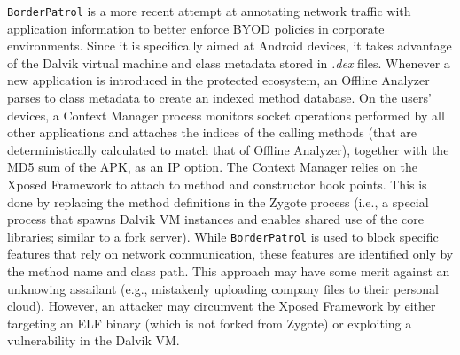 \texttt{BorderPatrol} \cite{zungur2019borderpatrol} is a more recent attempt at annotating network traffic with application information to better enforce BYOD policies in corporate environments. Since it is specifically aimed at Android devices, it takes advantage of the Dalvik virtual machine and class metadata stored in \textit{.dex} files. Whenever a new application is introduced in the protected ecosystem, an Offline Analyzer parses to class metadata to create an indexed method database. On the users' devices, a Context Manager process monitors socket operations performed by all other applications and attaches the indices of the calling methods (that are deterministically calculated to match that of Offline Analyzer), together with the MD5 sum of the APK, as an IP option. The Context Manager relies on the Xposed Framework to attach to method and constructor hook points. This is done by replacing the method definitions in the Zygote process (i.e., a special process that spawns Dalvik VM instances and enables shared use of the core libraries; similar to a fork server). While \texttt{BorderPatrol} is used to block specific features that rely on network communication, these features are identified only by the method name and class path. This approach may have some merit against an unknowing assailant (e.g., mistakenly uploading company files to their personal cloud). However, an attacker may circumvent the Xposed Framework by either targeting an ELF binary (which is not forked from Zygote) or exploiting a vulnerability in the Dalvik VM.

